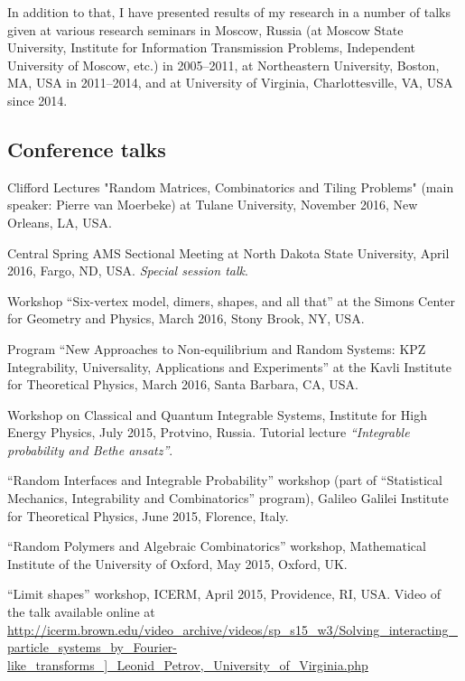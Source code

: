 \documentclass[letterpaper,11pt]{article}
\begin{document}
In addition to that, I have presented results of my research in a number of talks given at various research seminars in Moscow, Russia (at Moscow State University, Institute for Information Transmission Problems, Independent University of Moscow, etc.) in 2005--2011, at Northeastern University, Boston, MA, USA in 2011--2014, and
at University of Virginia, Charlottesville, VA, USA since 2014.

\subsection*{Conference talks}

\begin{etaremune}

\item Clifford Lectures 
	"Random Matrices, Combinatorics and Tiling Problems" 
	(main speaker: Pierre van Moerbeke) at Tulane University, 
	November 2016, New Orleans, LA, USA.

\item Central Spring AMS Sectional Meeting 
at 
North Dakota State University, April 2016, 
Fargo, ND, USA. \emph{Special session talk}.

\item 
Workshop 
``Six-vertex model, dimers, shapes, and all that''
at the
Simons Center for Geometry and Physics,
March 2016, Stony Brook, NY, USA.

\item 
Program ``New Approaches to Non-equilibrium and Random Systems: 
KPZ Integrability, Universality, Applications and Experiments''
at the Kavli Institute for Theoretical Physics, 
March 2016, Santa Barbara, CA, USA.

\item Workshop on Classical and Quantum Integrable Systems, 
Institute for High Energy Physics, July 2015, Protvino, Russia.
Tutorial lecture \emph{``Integrable probability and Bethe ansatz''}.

\item 
``Random Interfaces and Integrable Probability'' workshop (part of 
``Statistical Mechanics, Integrability and Combinatorics'' program), 
Galileo Galilei Institute for Theoretical Physics, June 2015, Florence, Italy.

\item ``Random Polymers and Algebraic Combinatorics'' workshop, 
Mathematical Institute of the University of Oxford, May 2015, Oxford, UK.

\item ``Limit shapes'' workshop, ICERM, April 2015, Providence, RI, USA. Video of the talk available 
online at 
\url{http://icerm.brown.edu/video_archive/videos/sp_s15_w3/Solving_interacting_particle_systems_by_Fourier-like_transforms_]_Leonid_Petrov,_University_of_Virginia.php}


\end{etaremune}
\end{document}
